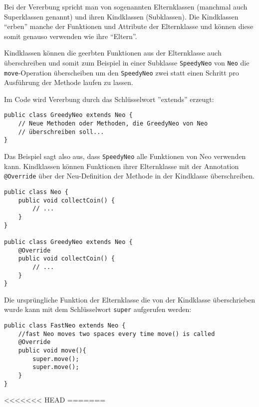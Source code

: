 \begin{Infobox}[Vererbung]
Bei der Vererbung spricht man von sogenannten Elternklassen (manchmal auch Superklassen genannt) und ihren Kindklassen (Subklassen).
Die Kindklassen \enquote{erben} manche der Funktionen und Attribute der Elternklasse und können diese somit genauso verwenden wie ihre \enquote{Eltern}.\newline

Kindklassen können die geerbten Funktionen aus der Elternklasse auch überschreiben und somit zum Beispiel in einer Subklasse \lstinline{SpeedyNeo} von \lstinline{Neo} die \lstinline{move}-Operation überscheiben um den \lstinline{SpeedyNeo} zwei statt einen Schritt pro Ausführung der Methode laufen zu lassen.

Im Code wird Vererbung durch das Schlüsselwort ''extends'' erzeugt:

\begin{lstlisting}[xleftmargin=0.5cm]
public class GreedyNeo extends Neo {
	// Neue Methoden oder Methoden, die GreedyNeo von Neo
	// überschreiben soll...
}
\end{lstlisting}

Das Beispiel sagt also aus, dass \lstinline{SpeedyNeo} alle Funktionen von Neo verwenden kann.\newline
Kindklassen können Funktionen ihrer Elternklasse mit der Annotation \lstinline{@Override} über der Neu-Definition der Methode in der Kindklasse überschreiben.

\begin{lstlisting}[xleftmargin=0.5cm]
public class Neo {
	public void collectCoin() {
		// ...
	}
}

public class GreedyNeo extends Neo {
	@Override
	public void collectCoin() {
		// ...
	}
}
\end{lstlisting}
Die ursprüngliche Funktion der Elternklasse die von der Kindklasse überschrieben wurde kann mit dem Schlüsselwort \lstinline{super} aufgerufen werden:
\begin{lstlisting}[xleftmargin=0.5cm]
public class FastNeo extends Neo {
	//fast Neo moves two spaces every time move() is called
	@Override
	public void move(){
		super.move();
		super.move();
	}
}
\end{lstlisting}
\end{Infobox}
\newpage

<<<<<<< HEAD
=======

